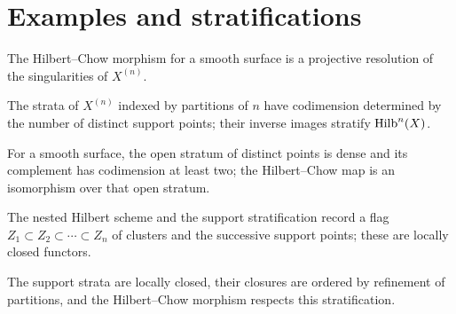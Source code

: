 \section{Examples and stratifications}
\begin{theorem}\label{fga-thm-7-1-14}
The Hilbert--Chow morphism for a smooth surface is a projective resolution of
the singularities of $X^{(n)}$.
\end{theorem}
\begin{lemma}\label{fga-lem-7-2-1}
The strata of $X^{(n)}$ indexed by partitions of $n$ have codimension determined
by the number of distinct support points; their inverse images stratify
$\operatorname{Hilb}^n(X)$.
\end{lemma}
\begin{theorem}\label{fga-thm-7-2-3}
For a smooth surface, the open stratum of distinct points is dense and its
complement has codimension at least two; the Hilbert--Chow map is an isomorphism
over that open stratum.
\end{theorem}
\begin{definition}\label{fga-def-7-4-1}
The nested Hilbert scheme and the support stratification record a flag
$Z_1\subset Z_2\subset\cdots\subset Z_n$ of clusters and the successive
support points; these are locally closed functors.
\end{definition}
\begin{proposition}\label{fga-prop-7-4-4}
The support strata are locally closed, their closures are ordered by refinement
of partitions, and the Hilbert--Chow morphism respects this stratification.
\end{proposition}

